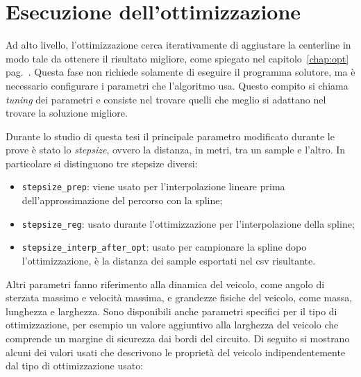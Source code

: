 \newpage


\section{Esecuzione dell'ottimizzazione}
Ad alto livello, l'ottimizzazione cerca iterativamente di aggiustare la centerline in modo tale da
ottenere il risultato migliore, come spiegato nel capitolo~\ref{chap:opt} pag.~\pageref{chap:opt}.
Questa fase non richiede solamente di eseguire il programma solutore, ma è necessario
configurare i parametri che l'algoritmo usa. Questo compito si chiama \textit{tuning} dei parametri
e consiste nel trovare quelli che meglio si adattano nel trovare la soluzione migliore.

Durante lo studio di questa tesi il principale parametro modificato durante le prove è stato lo
\textit{stepsize}, ovvero la distanza, in metri, tra un sample e l'altro. In particolare si distinguono
tre stepsize diversi:
\begin{itemize}
	\item \verb|stepsize_prep|: viene usato per l'interpolazione lineare prima dell'approssimazione del
		percorso con la spline;
	\item \verb|stepsize_reg|: usato durante l'ottimizzazione per l'interpolazione della spline;
	\item \verb|stepsize_interp_after_opt|: usato per campionare la spline dopo l'ottimizzazione, è la
		distanza dei sample esportati nel csv risultante.
\end{itemize}
Altri parametri fanno riferimento alla dinamica del veicolo, come angolo di sterzata massimo e velocità
massima, e grandezze fisiche del veicolo, come massa, lunghezza e larghezza. Sono disponibili anche
parametri specifici per il tipo di ottimizzazione, per esempio un valore aggiuntivo alla larghezza del
veicolo che comprende un margine di sicurezza dai bordi del circuito. Di seguito si mostrano alcuni dei
valori usati che descrivono le proprietà del veicolo indipendentemente dal tipo di ottimizzazione usato:

